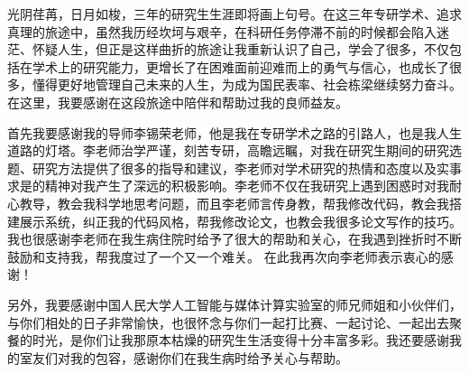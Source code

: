 \begin{acknowledge}%
    光阴荏苒，日月如梭，三年的研究生生涯即将画上句号。在这三年专研学术、追求真理的旅途中，虽然我历经坎坷与艰辛，在科研任务停滞不前的时候都会陷入迷茫、怀疑人生，但正是这样曲折的旅途让我重新认识了自己，学会了很多，不仅包括在学术上的研究能力，更增长了在困难面前迎难而上的勇气与信心，也成长了很多，懂得更好地管理自己未来的人生，为成为国民表率、社会栋梁继续努力奋斗。在这里，我要感谢在这段旅途中陪伴和帮助过我的良师益友。

    首先我要感谢我的导师李锡荣老师，他是我在专研学术之路的引路人，也是我人生道路的灯塔。李老师治学严谨，刻苦专研，高瞻远瞩，对我在研究生期间的研究选题、研究方法提供了很多的指导和建议，李老师对学术研究的热情和态度以及实事求是的精神对我产生了深远的积极影响。李老师不仅在我研究上遇到困惑时对我耐心教导，教会我科学地思考问题，而且李老师言传身教，帮我修改代码，教会我搭建展示系统，纠正我的代码风格，帮我修改论文，也教会我很多论文写作的技巧。我也很感谢李老师在我生病住院时给予了很大的帮助和关心，在我遇到挫折时不断鼓励和支持我，帮我度过了一个又一个难关。
    在此我再次向李老师表示衷心的感谢！

    另外，我要感谢中国人民大学人工智能与媒体计算实验室的师兄师姐和小伙伴们，与你们相处的日子非常愉快，也很怀念与你们一起打比赛、一起讨论、一起出去聚餐的时光，是你们让我那原本枯燥的研究生生活变得十分丰富多彩。我还要感谢我的室友们对我的包容，感谢你们在我生病时给予关心与帮助。
\end{acknowledge}
